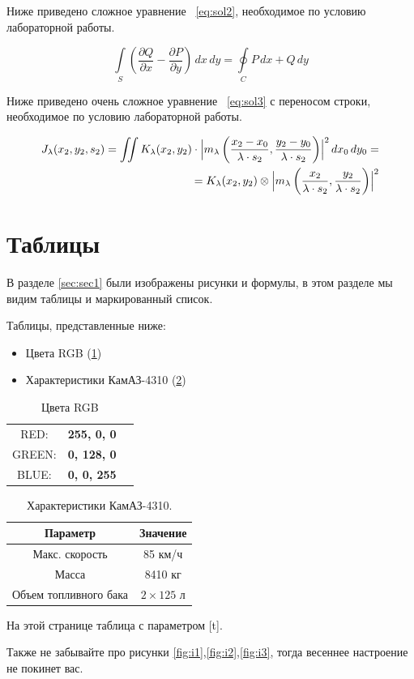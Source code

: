 \documentclass[a4paper,12pt]{article}         %
\begin{document}
Ниже приведено сложное уравнение ~\ref{eq:sol2}, необходимое по условию лабораторной работы.

\begin{equation}\label{eq:sol2}
\int \limits_S \left( \frac{\partial Q}{\partial x} - \frac{\partial P}{\partial y} \right)\, dx \, dy =\oint \limits_C P\,dx + Q \, dy
\end{equation}

Ниже приведено очень сложное уравнение ~\ref{eq:sol3} с переносом строки, необходимое по условию лабораторной работы.


\begin{eqnarray}\label{eq:sol3}
J_\lambda(x_2, y_2, s_2) =
\iint K_\lambda(x_2, y_2) \cdot \Bigl| m_\lambda
\left(
\frac{x_2-x_0}{\lambda \cdot s_2} , \frac{y_2-y_0}{\lambda \cdot s_2}\right)\Bigr|^2 \,dx_0\,dy_0 = \nonumber \\
= K_\lambda(x_2, y_2) \otimes \Bigl| m_\lambda \left( \frac{x_2}{\lambda \cdot s_2} , \frac{y_2}{\lambda \cdot s_2} \right) \Bigr|^2
\end{eqnarray}
\newpage
\section{Таблицы}
\label{sec:sec2}
В разделе \ref{sec:sec1} были изображены рисунки и формулы, в этом разделе мы видим таблицы и маркированный список.

Таблицы, представленные ниже:
\begin{itemize}
	\item Цвета RGB (\ref{tabular:t1})
	\item Характеристики КамАЗ-4310 (\ref{tabular:t2})
\end{itemize}
\begin{table}[h]

	\caption{Цвета RGB}
	\label{tabular:t1}
	\begin{center}
		\begin{tabular}{ccc}
			RED: & \textbf{255, 0, 0}\\
			GREEN: & \textbf{0, 128, 0} \\
			BLUE: & \textbf{0, 0, 255}\\
		\end{tabular}
	\end{center}
\end{table}
\begin{table}[t]
\caption{\label{tabular:t2}Характеристики КамАЗ-4310.}
\begin{center}
	\begin{tabular}{|c|c|}
		\hline
		Параметр & Значение \\
		\hline
		Макс. скорость & 85 км/ч \\
		Масса &  8410 кг \\
		Объем топливного бака & $2 \times 125$ л \\
		\hline
		
	\end{tabular}
\end{center}
\end{table} 
\newpage
На этой странице таблица с параметром [t]. 

Также не забывайте про рисунки \ref{fig:i1},\ref{fig:i2},\ref{fig:i3}, тогда весеннее настроение не покинет вас.
\newpage
\end{document}
